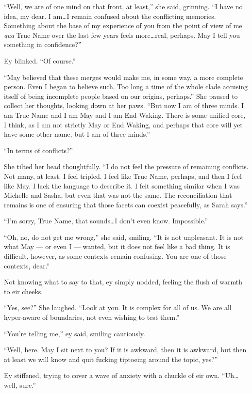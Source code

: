 ``Well, we are of one mind on that front, at least,'' she said, grinning. ``I have no idea, my dear. I am\ldots I remain confused about the conflicting memories. Something about the base of my experience of you from the point of view of me \emph{qua} True Name over the last few years feels more\ldots real, perhaps. May I tell you something in confidence?''

Ey blinked. ``Of course.''

``May believed that these merges would make me, in some way, a more complete person. Even I began to believe such. Too long a time of the whole clade accusing itself of being incomplete people based on our origins, perhaps.'' She paused to collect her thoughts, looking down at her paws. ``But now I am of three minds. I am True Name and I am May and I am End Waking. There is some unified core, I think, as I am not strictly May or End Waking, and perhaps that core will yet have some other name, but I am of three minds.''

``In terms of conflicts?''

She tilted her head thoughtfully. ``I do not feel the pressure of remaining conflicts. Not many, at least. I feel tripled. I feel like True Name, perhaps, and then I feel like May. I lack the language to describe it. I felt something similar when I was Michelle and Sasha, but even that was not the same. The reconciliation that remains is one of ensuring that those facets can coexist peacefully, as Sarah says.''

``I'm sorry, True Name, that sounds\ldots I don't even know. Impossible.''

``Oh, no, do not get me wrong,'' she said, smiling. ``It is not unpleasant. It is not what May — or even I — wanted, but it does not feel like a bad thing. It is difficult, however, as some contexts remain confusing. You are one of those contexts, dear.''

Not knowing what to say to that, ey simply nodded, feeling the flush of warmth to eir cheeks.

``Yes, see?'' She laughed. ``Look at you. It is complex for all of us. We are all hyper-aware of boundaries, not even wishing to test them.''

``You're telling me,'' ey said, smiling cautiously.

``Well, here. May I sit next to you? If it is awkward, then it is awkward, but then at least we will know and quit fucking tiptoeing around the topic, yes?''

Ey stiffened, trying to cover a wave of anxiety with a chuckle of eir own. ``Uh\ldots well, sure.''

